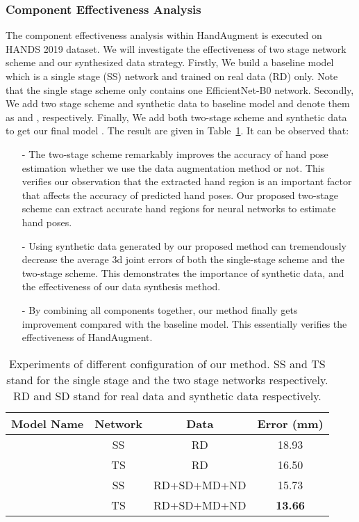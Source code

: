 \documentclass{article}
\begin{document}
\subsubsection{Component Effectiveness Analysis}
The component effectiveness analysis within HandAugment is executed on HANDS 2019 dataset. We will investigate the effectiveness of two stage network scheme and our synthesized data strategy. 
Firstly, We build a baseline model  which is a single stage (SS) network and trained on real data (RD) only. Note that the single stage scheme only contains one EfficientNet-B0 network.
Secondly, We add two stage scheme and synthetic data to baseline model and denote them as  and , respectively.
Finally, We add both two-stage scheme and synthetic data to get our final model .
The result are given in Table~\ref{tab:ablation_all}.
It can be observed that:
\begin{itemize}
\item[-] The two-stage scheme remarkably improves the accuracy of hand pose estimation whether we use the data augmentation method or not. This verifies our observation that the extracted hand region is an important factor that affects the accuracy of predicted hand poses. Our proposed two-stage scheme can extract accurate hand regions for neural networks to estimate hand poses.
\item[-] Using synthetic data generated by our proposed method can tremendously decrease the average 3d joint errors of both the single-stage scheme and the two-stage scheme. This demonstrates the importance of synthetic data, and the effectiveness of our data synthesis method. 
\item[-] By combining all components together, our method finally gets  improvement compared with the baseline model. This essentially verifies the effectiveness of HandAugment.
\end{itemize}


\begin{table}
\centering
\begin{tabular}{cccc}
\hline
Model Name & Network & Data & Error (mm) \\ \hline
 & SS & RD  & 18.93 \\ \hline
 & TS & RD & 16.50 \\ \hline
 & SS & RD+SD+MD+ND & 15.73 \\ \hline
 & TS & RD+SD+MD+ND & \textbf{13.66} \\
\hline
\end{tabular}	\caption{\label{tab:ablation_all} Experiments of different configuration of our method. SS and TS stand for the single stage and the two stage networks respectively. RD and SD stand for real data and synthetic data respectively.}
\end{table}
\end{document}
